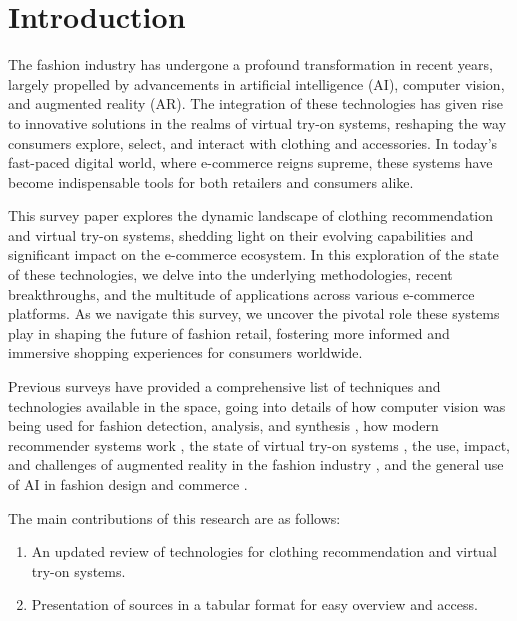 \section{Introduction}
	The fashion industry has undergone a profound transformation in recent years, largely propelled by advancements in artificial intelligence (AI), computer vision, and augmented reality (AR). The integration of these technologies has given rise to innovative solutions in the realms of virtual try-on systems, reshaping the way consumers explore, select, and interact with clothing and accessories. In today's fast-paced digital world, where e-commerce reigns supreme, these systems have become indispensable tools for both retailers and consumers alike.

	This survey paper explores the dynamic landscape of clothing recommendation and virtual try-on systems, shedding light on their evolving capabilities and significant impact on the e-commerce ecosystem. In this exploration of the state of these technologies, we delve into the underlying methodologies, recent breakthroughs, and the multitude of applications across various e-commerce platforms. As we navigate this survey, we uncover the pivotal role these systems play in shaping the future of fashion retail, fostering more informed and immersive shopping experiences for consumers worldwide.

	Previous surveys have provided a comprehensive list of techniques and technologies available in the space, going into details of how computer vision was being used for fashion detection, analysis, and synthesis \cite{DBLP:journals/csur/ChengSCHL21, Jain_Wah_2022}, how modern recommender systems work \cite{DBLP:journals/corr/abs-2202-02757, DBLP:journals/sncs/ShirkhaniMSH23}, the state of virtual try-on systems \cite{DBLP:journals/corr/abs-2111-00905, DBLP:journals/mta/GhodhbaniNRA22, DBLP:journals/cvm/LiangL21}, the use, impact, and challenges of augmented reality in the fashion industry \cite{menon2020impact, jayamini2021use, DBLP:journals/corr/abs-2202-09450, huang2019enhancing, mehta2020enhancement, zak2020augmented, caboni2019augmented}, and the general use of AI in fashion design and commerce \cite{DBLP:journals/access/GiriJZB19, DBLP:journals/corr/abs-2105-03050, DBLP:journals/access/GuoZLCCW23, DBLP:journals/spm/ChenSC23, sahni2021review, liang2020implementation, sareen2022ai, 10153335, DBLP:journals/tmm/Yan0LZX0Y23}.

	The main contributions of this research are as follows:
	\begin{enumerate}
		\item An updated review of technologies for clothing recommendation and virtual try-on systems.
		\item Presentation of sources in a tabular format for easy overview and access.
	\end{enumerate}


